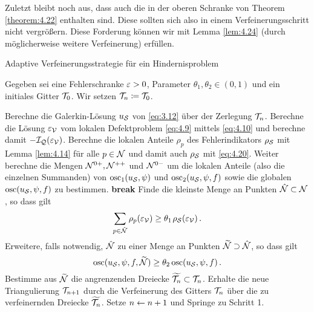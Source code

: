 Zuletzt bleibt noch aus, dass auch die  in der oberen Schranke von Theorem \ref{theorem:4.22} enthalten sind. Diese sollten sich also in einem Verfeinerungsschritt nicht vergrößern. Diese Forderung können wir mit Lemma \ref{lem:4.24} (durch möglicherweise weitere Verfeinerung) erfüllen.



\begin{algorithm}[H]
\caption{Adaptive Verfeinerungsstrategie für ein Hindernisproblem\label{alg:4.1}}
Gegeben sei eine Fehlerschranke $\varepsilon>0$, Parameter $\theta_1,\theta_2 \in (0,1)$ und ein initiales Gitter $\mathcal T_0$. Wir setzen $\mathcal T_n \coloneqq \mathcal T_0$.
\begin{algorithmic}[1] 
\State Berechne die Galerkin-Lösung $u_{\mathcal S}$ von \eqref{eq:3.12} über der Zerlegung $\mathcal T_n$.
\State Berechne die Lösung $\varepsilon_{\mathcal V}$ vom lokalen Defektproblem \eqref{eq:4.9} mittels \eqref{eq:4.10} und berechne damit $-\mathcal I_{\mathcal Q}(\varepsilon_{\mathcal V})$.
\State Berechne die lokalen Anteile $\rho_p$ des Fehlerindikators $\rho_{\mathcal S}$ mit Lemma \ref{lem:4.14} für alle $p \in \mathcal N$ und damit auch $\rho_{\mathcal S}$ mit \eqref{eq:4.20}. 
\State Weiter berechne die Mengen $\mathcal N^{0+},\mathcal N^{++}$ und $\mathcal N^{0-}$ um die lokalen Anteile (also die einzelnen Summanden) von $\operatorname{osc}_1(u_{\mathcal S},\psi)$ und $\operatorname{osc}_2(u_{\mathcal S},\psi,f)$ sowie die globalen  $\operatorname{osc} (u_{\mathcal S},\psi,f)$ zu bestimmen.
\State \textbf{break} 
\EndIf 
\State Finde die kleinste Menge an Punkten $\hat{\mathcal N}\subset \mathcal N$, so dass gilt
\[
	\sum_{p \in \hat{\mathcal N}} \rho_p (\varepsilon_{\mathcal V}) \ge \theta_1\;\! \rho_{\mathcal S}(\varepsilon_{\mathcal V}) \,.
\]
\State Erweitere, falls notwendig, $\hat{\mathcal N}$ zu einer Menge an Punkten $\widetilde{\mathcal N} \supset \hat{\mathcal N}$, so dass gilt
\[
	\operatorname{osc} (u_{\mathcal S},\psi,f,\widetilde{\mathcal N}) \ge \theta_2 \operatorname{osc} (u_{\mathcal S},\psi,f) \, .
\]
\State Bestimme aus $\widetilde{\mathcal N}$ die angrenzenden Dreiecke $\widetilde{\mathcal T_n} \subset \mathcal T_n$. 
\State Erhalte die neue Triangulierung $\mathcal T_{n+1}$ durch die Verfeinerung des Gitters $\mathcal T_n$ über die zu verfeinernden Dreiecke $\widetilde{\mathcal T_n}$.
\State Setze $n \leftarrow n+1$ und Springe zu Schritt 1.
\end{algorithmic}
\end{algorithm}




